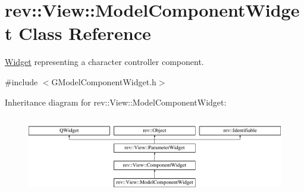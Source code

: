 \hypertarget{classrev_1_1_view_1_1_model_component_widget}{}\section{rev\+::View\+::Model\+Component\+Widget Class Reference}
\label{classrev_1_1_view_1_1_model_component_widget}


\mbox{\hyperlink{class_widget}{Widget}} representing a character controller component.  




{\ttfamily \#include $<$G\+Model\+Component\+Widget.\+h$>$}

Inheritance diagram for rev\+::View\+::Model\+Component\+Widget\+:\begin{figure}[H]
\begin{center}
\leavevmode
\includegraphics[height=3.472868cm]{classrev_1_1_view_1_1_model_component_widget}
\end{center}
\end{figure}
